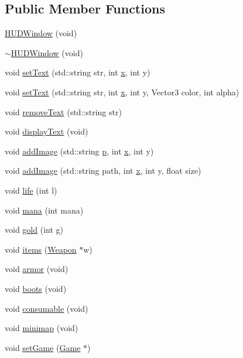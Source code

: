 \subsection*{Public Member Functions}
\begin{DoxyCompactItemize}
\item 
\hyperlink{class_h_u_d_window_a8d97402012deb77be8008cfed176fdd6}{H\-U\-D\-Window} (void)
\item 
\hyperlink{class_h_u_d_window_ac1c288c91430729735038fcefc4bcdb8}{$\sim$\-H\-U\-D\-Window} (void)
\item 
void \hyperlink{class_h_u_d_window_a77a524e42af9d069137b70a1e5653df1}{set\-Text} (std\-::string str, int \hyperlink{jquery_8js_a4c3eadaa5164016d2c340d495fc6e55e}{x}, int y)
\item 
void \hyperlink{class_h_u_d_window_ade8fc1411dee1078b26498370bbef672}{set\-Text} (std\-::string str, int \hyperlink{jquery_8js_a4c3eadaa5164016d2c340d495fc6e55e}{x}, int y, Vector3 color, int alpha)
\item 
void \hyperlink{class_h_u_d_window_a0aedfd1f3c8354da1b69f1b592d4ad3e}{remove\-Text} (std\-::string str)
\item 
void \hyperlink{class_h_u_d_window_a12148d8845eaa5a663d816a4befba0dd}{display\-Text} (void)
\item 
void \hyperlink{class_h_u_d_window_a94366d6f68535133a56d0b38228460e0}{add\-Image} (std\-::string \hyperlink{jquery_8js_a2335e57f79b6acfb6de59c235dc8a83e}{p}, int \hyperlink{jquery_8js_a4c3eadaa5164016d2c340d495fc6e55e}{x}, int y)
\item 
void \hyperlink{class_h_u_d_window_aee140416af161a6d8acc2b0c83370088}{add\-Image} (std\-::string path, int \hyperlink{jquery_8js_a4c3eadaa5164016d2c340d495fc6e55e}{x}, int y, float size)
\item 
void \hyperlink{class_h_u_d_window_a8fc917fbfae792d046e90448c963100a}{life} (int l)
\item 
void \hyperlink{class_h_u_d_window_a6eb79b572849709a329e65ed2afd2e9e}{mana} (int mana)
\item 
void \hyperlink{class_h_u_d_window_a4eb34de71e2ea671f637381ac255edab}{gold} (int g)
\item 
void \hyperlink{class_h_u_d_window_a9edf25a0b1cf568aa3f338281d81d99a}{items} (\hyperlink{class_weapon}{Weapon} $\ast$w)
\item 
void \hyperlink{class_h_u_d_window_a1c6965adb9fdd22b230d20b26fef5ac0}{armor} (void)
\item 
void \hyperlink{class_h_u_d_window_acd4fdbfd1c2562384b84d3bcda80fea1}{boots} (void)
\item 
void \hyperlink{class_h_u_d_window_a378bc8269cacb151f68cfb37114e0c38}{consumable} (void)
\item 
void \hyperlink{class_h_u_d_window_a8264836f3c55d8211f4e5166e9049628}{minimap} (void)
\item 
void \hyperlink{class_h_u_d_window_a5baefc7b585437df2639fda359c3cf46}{set\-Game} (\hyperlink{class_game}{Game} $\ast$)
\end{DoxyCompactItemize}


